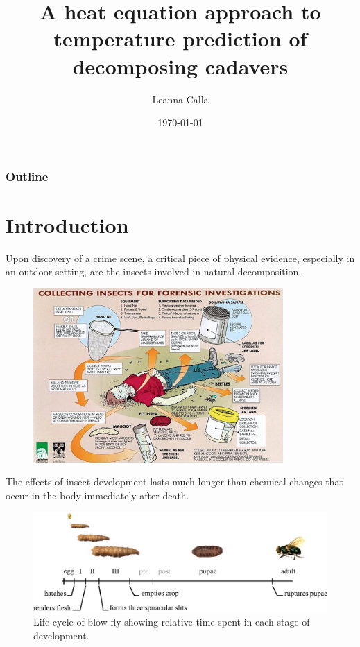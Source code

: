 \documentclass{beamer}
\title{A heat equation approach to temperature prediction of decomposing cadavers}
\author{Leanna Calla}
\institute{University of Ontario Institute of Technology}
\date{\today}
\begin{document}
\frame{\titlepage}

\begin{frame}
  \frametitle{Outline}
\tableofcontents
\end{frame}

\section{Introduction}
  
\begin{frame}
  Upon discovery of a crime scene, a critical piece of physical
  evidence, especially in an outdoor setting, are the insects involved
  in natural decomposition.
  \begin{figure}
    \includegraphics[width=0.85\textwidth]{Figures/scene2}
 
 \end{figure}
\end{frame}

\begin{frame}
   The effects of insect development lasts much longer than
  chemical changes that occur in the body immediately after death.
  \begin{figure}
    \includegraphics[width=\textwidth]{Figures/blowflycycle}
      \caption{Life cycle of blow fly showing relative time spent in
      each stage of development.}
  \end{figure}

\end{frame}
\end{document}
